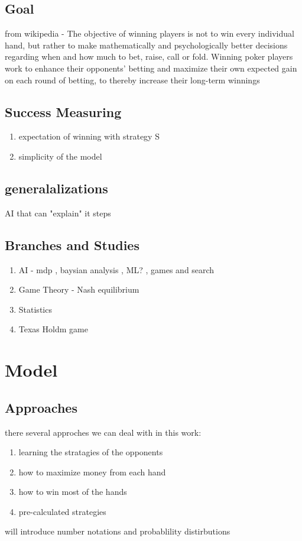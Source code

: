 \documentclass{article}
\begin{document}
\subsection{Goal}
from wikipedia - The objective of winning players is not to win every individual hand, but rather to make mathematically and psychologically better decisions regarding when and how much to bet, raise, call or fold. Winning poker players work to enhance their opponents' betting and maximize their own expected gain on each round of betting, to thereby increase their long-term winnings
\subsection{Success Measuring}
\begin{enumerate}
\item expectation of winning with strategy S
\item simplicity of the model
\end{enumerate}
\subsection{generalalizations}
AI that can "explain" it steps
\subsection{Branches and Studies}
\begin{enumerate}
  \item AI - mdp , baysian analysis , ML? , games and search
   \item Game Theory - Nash equilibrium
   \item Statistics
   \item  Texas Holdm game
\end{enumerate}
\section{Model}
\subsection{Approaches}
there several approches we can deal with in this work:
\begin{enumerate}
  \item learning the stratagies of the opponents
   \item how to maximize money from each hand
   \item how to win most of the hands
   \item pre-calculated strategies
\end{enumerate}
will introduce number notations and probablility distirbutions
\end{document}
